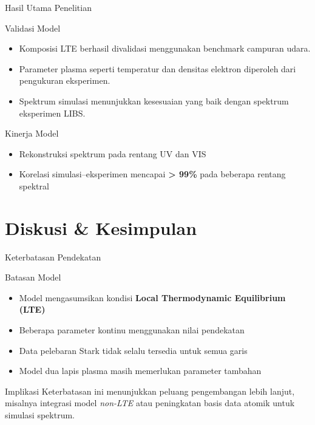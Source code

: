 \documentclass[aspectratio=169, 10pt]{beamer}
\begin{document}
\begin{frame}{Hasil Utama Penelitian}
  \begin{block}{Validasi Model}
    \begin{itemize}
      \item Komposisi LTE berhasil divalidasi menggunakan benchmark
            campuran udara.
      \item Parameter plasma seperti temperatur dan densitas elektron
            diperoleh dari pengukuran eksperimen.
      \item Spektrum simulasi menunjukkan kesesuaian yang baik dengan
            spektrum eksperimen LIBS.
    \end{itemize}
  \end{block}

  \begin{exampleblock}{Kinerja Model}
    \begin{itemize}
      \item Rekonstruksi spektrum pada rentang UV dan VIS
      \item Korelasi simulasi--eksperimen mencapai
            \textbf{> 99\%} pada beberapa rentang spektral
    \end{itemize}
  \end{exampleblock}
\end{frame}

\section{Diskusi \& Kesimpulan}

\begin{frame}{Keterbatasan Pendekatan}
  \begin{alertblock}{Batasan Model}
    \begin{itemize}
      \item Model mengasumsikan kondisi
            \textbf{Local Thermodynamic Equilibrium (LTE)}
      \item Beberapa parameter kontinu menggunakan nilai pendekatan
      \item Data pelebaran Stark tidak selalu tersedia untuk semua garis
      \item Model dua lapis plasma masih memerlukan parameter tambahan
    \end{itemize}
  \end{alertblock}

  \begin{block}{Implikasi}
    Keterbatasan ini menunjukkan peluang pengembangan lebih lanjut,
    misalnya integrasi model \textit{non-LTE} atau peningkatan basis
    data atomik untuk simulasi spektrum.
  \end{block}
\end{frame}
\end{document}

